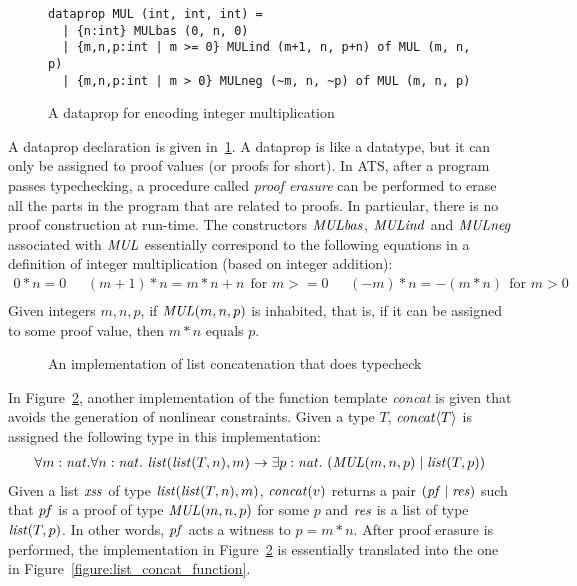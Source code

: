 \begin{figure}[thp]
\begin{verbatim}
dataprop MUL (int, int, int) =
  | {n:int} MULbas (0, n, 0)
  | {m,n,p:int | m >= 0} MULind (m+1, n, p+n) of MUL (m, n, p)
  | {m,n,p:int | m > 0} MULneg (~m, n, ~p) of MUL (m, n, p)
\end{verbatim}
\caption{A dataprop for encoding integer multiplication}
\label{figure:dataprop_for_integer_multiplication}
\end{figure}
A dataprop declaration is given
in~\ref{figure:dataprop_for_integer_multiplication}. A dataprop is like a
datatype, but it can only be assigned to proof values (or proofs for
short).  In ATS, after a program passes typechecking, a procedure called
{\em proof erasure} can be performed to erase all the parts in the program
that are related to proofs. In particular, there is no proof construction
at run-time. The constructors ${\it MULbas}$, ${\it MULind}$ and ${\it
MULneg}$ associated with ${\it MUL}$ essentially correspond to the
following equations in a definition of integer multiplication (based on
integer addition):
\[\begin{array}{lll}
0 * n = 0 ~~~&
(m+1) * n = m * n + n~~\mbox{for $m>=0$}~~~&
(-m) * n = -(m * n)~~\mbox{for $m>0$} \\\
\end{array}\]
Given integers $m,n,p$, if ${\it MUL}(m,n,p)$ is inhabited, that is,
if it can be assigned to some proof value, then $m*n$ equals $p$.

\begin{figure}[thp]

\caption{An implementation of list concatenation that does typecheck}
\label{figure:list_concat_function_proof}
\end{figure}
In Figure~\ref{figure:list_concat_function_proof}, another implementation
of the function template {\it concat} is given that avoids the generation
of nonlinear constraints. Given a type $T$, ${\it concat}\langle{T}\rangle$
is assigned the following type in this implementation:
\[\begin{array}{l}
\forall{m:{\it nat}}.\forall{n:{\it nat}}.~
{\it list}({\it list}(T,n),m)\rightarrow\exists{p:{\it nat}}.~({\it MUL}(m,n,p)\mid{\it list}(T,p)) \\
\end{array}\]
Given a list ${\it xss}$ of type ${\it list}({\it list}(T,n),m)$, ${\it concat}(v)$
returns a pair $({\it pf}\mid{\it res})$ such that ${\it pf}$ is a proof of
type ${\it MUL}(m,n,p)$ for some $p$ and ${\it res}$ is a list of type
${\it list}(T,p)$. In other words, ${\it pf}$ acts a witness to $p=m*n$. After
proof erasure is performed, the implementation in
Figure~\ref{figure:list_concat_function_proof} is essentially translated
into the one in Figure~\ref{figure:list_concat_function}.

